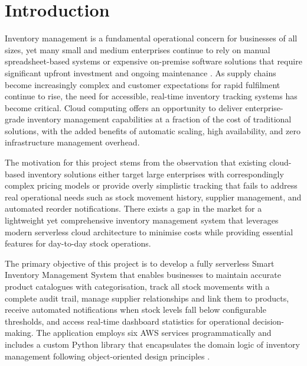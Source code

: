 \documentclass[conference]{IEEEtran}
\begin{document}
\section{Introduction}

Inventory management is a fundamental operational concern for businesses of all sizes, yet many small and medium enterprises continue to rely on manual spreadsheet-based systems or expensive on-premise software solutions that require significant upfront investment and ongoing maintenance \cite{inventorymgmt}. As supply chains become increasingly complex and customer expectations for rapid fulfilment continue to rise, the need for accessible, real-time inventory tracking systems has become critical. Cloud computing offers an opportunity to deliver enterprise-grade inventory management capabilities at a fraction of the cost of traditional solutions, with the added benefits of automatic scaling, high availability, and zero infrastructure management overhead.

The motivation for this project stems from the observation that existing cloud-based inventory solutions either target large enterprises with correspondingly complex pricing models or provide overly simplistic tracking that fails to address real operational needs such as stock movement history, supplier management, and automated reorder notifications. There exists a gap in the market for a lightweight yet comprehensive inventory management system that leverages modern serverless cloud architecture to minimise costs while providing essential features for day-to-day stock operations.

The primary objective of this project is to develop a fully serverless Smart Inventory Management System that enables businesses to maintain accurate product catalogues with categorisation, track all stock movements with a complete audit trail, manage supplier relationships and link them to products, receive automated notifications when stock levels fall below configurable thresholds, and access real-time dashboard statistics for operational decision-making. The application employs six AWS services programmatically and includes a custom Python library that encapsulates the domain logic of inventory management following object-oriented design principles \cite{cloudpatterns}.

\end{document}
